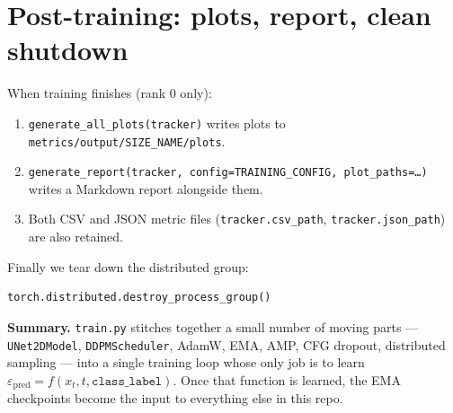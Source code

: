 \documentclass[11pt]{article}
\newcommand{\code}[1]{\texttt{#1}}
\newcommand{\xT}{x_t}
\newcommand{\eps}{\varepsilon}
\begin{document}
\section{Post-training: plots, report, clean shutdown}

When training finishes (rank 0 only):

\begin{enumerate}[leftmargin=*]
  \item \code{generate\_all\_plots(tracker)} writes plots to
        \code{metrics/output/SIZE\_NAME/plots}.
  \item \code{generate\_report(tracker, config=TRAINING\_CONFIG, plot\_paths=\dots)}
        writes a Markdown report alongside them.
  \item Both CSV and JSON metric files (\code{tracker.csv\_path},
        \code{tracker.json\_path}) are also retained.
\end{enumerate}

Finally we tear down the distributed group:
\begin{lstlisting}
torch.distributed.destroy_process_group()
\end{lstlisting}

\medskip
\noindent\textbf{Summary.} \code{train.py} stitches together a small number of
moving parts --- \code{UNet2DModel}, \code{DDPMScheduler}, AdamW, EMA, AMP,
CFG dropout, distributed sampling --- into a single training loop whose only
job is to learn $\eps_{\text{pred}} = f(\xT, t, \texttt{class\_label})$. Once
that function is learned, the EMA checkpoints become the input to everything
else in this repo.
\end{document}
